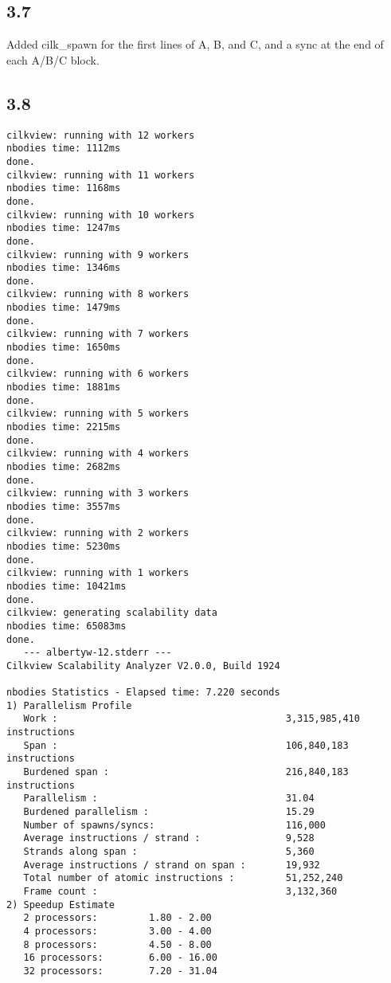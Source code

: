 \documentclass[12pt]{article}
\begin{document}
\subsection{3.7}
Added cilk\_spawn for the first lines of A, B, and C, and a sync at the end of each 
A/B/C block.  

\subsection{3.8}
\begin{verbatim}
cilkview: running with 12 workers
nbodies time: 1112ms
done.
cilkview: running with 11 workers
nbodies time: 1168ms
done.
cilkview: running with 10 workers
nbodies time: 1247ms
done.
cilkview: running with 9 workers
nbodies time: 1346ms
done.
cilkview: running with 8 workers
nbodies time: 1479ms
done.
cilkview: running with 7 workers
nbodies time: 1650ms
done.
cilkview: running with 6 workers
nbodies time: 1881ms
done.
cilkview: running with 5 workers
nbodies time: 2215ms
done.
cilkview: running with 4 workers
nbodies time: 2682ms
done.
cilkview: running with 3 workers
nbodies time: 3557ms
done.
cilkview: running with 2 workers
nbodies time: 5230ms
done.
cilkview: running with 1 workers
nbodies time: 10421ms
done.
cilkview: generating scalability data
nbodies time: 65083ms
done.
   --- albertyw-12.stderr --- 
Cilkview Scalability Analyzer V2.0.0, Build 1924

nbodies Statistics - Elapsed time: 7.220 seconds
1) Parallelism Profile
   Work :                                        3,315,985,410 instructions
   Span :                                        106,840,183 instructions
   Burdened span :                               216,840,183 instructions
   Parallelism :                                 31.04
   Burdened parallelism :                        15.29
   Number of spawns/syncs:                       116,000
   Average instructions / strand :               9,528
   Strands along span :                          5,360
   Average instructions / strand on span :       19,932
   Total number of atomic instructions :         51,252,240
   Frame count :                                 3,132,360
2) Speedup Estimate
   2 processors:         1.80 - 2.00
   4 processors:         3.00 - 4.00
   8 processors:         4.50 - 8.00
   16 processors:        6.00 - 16.00
   32 processors:        7.20 - 31.04


\end{verbatim}
\end{document}
